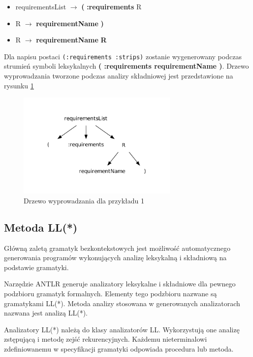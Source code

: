 \begin{itemize}
\item requirementsList $\rightarrow$ \textbf{(} \textbf{:requirements} R
\item R $\rightarrow$ \textbf{requirementName} \textbf{)}
\item R $\rightarrow$ \textbf{requirementName} \textbf{R}
\end{itemize}

Dla napisu postaci \texttt{(:requirements :strips)} zostanie
wygenerowany podczas strumień symboli leksykalnych \textbf{( :requirements requirementName )}.
Drzewo wyprowadzania tworzone podczas analizy składniowej jest przedstawione 
na rysunku \ref{antlr_example}

\begin{figure}[h!]
  \centering
    \includegraphics[width=0.7\textwidth]{img/antlr_example.pdf}
    \caption{Drzewo wyprowadzania dla przykładu 1}
    \label{antlr_example}
\end{figure}

\subsection{Metoda LL(*)}
Główną zaletą gramatyk bezkontekstowych jest możliwość automatycznego generowania programów
wykonujących analizę leksykalną i składniową na podstawie gramatyki.

Narzędzie ANTLR generuje analizatory leksykalne i składniowe dla pewnego podzbioru
gramatyk formalnych. Elementy tego podzbioru nazwane są gramatykami LL(*). Metoda 
analizy stosowana w generowanych analizatorach nazwana jest analizą LL(*). 

Analizatory LL(*) należą do klasy analizatorów LL. Wykorzystują one
analizę zstępującą i metodę zejść 
rekurencyjnych. Każdemu nieterminalowi zdefiniowanemu w specyfikacji gramatyki
odpowiada procedura lub metoda. 

